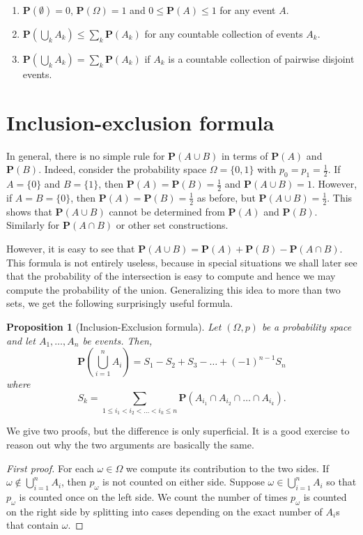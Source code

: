 \documentclass[preprint,  11pt]{amsart}
\newcommand{\para}[1]{\vspace{4mm}\noindent{\bfseries #1:}}
\theoremstyle{plain} %
\newtheorem{proposition}[theorem]{Proposition}
\theoremstyle{definition} %
\begin{document}
{{{{{{{{{{{{\para{The basic rules of probability}
{\begin{enumerate}\setlength\itemsep{6pt}
\item $\mathbf{P}(\emptyset)=0$, $\mathbf{P}(\Omega)=1$ and $0\le \mathbf{P}(A)\le 1$ for any event $A$.
\item $\mathbf{P}\left(\bigcup\limits_{k}A_{k}\right)\le \sum\limits_{k} \mathbf{P}(A_{k})$ for any countable collection of events $A_{k}$.
\item $\mathbf{P}\left(\bigcup\limits_{k}A_{k}\right)=\sum\limits_{k}\mathbf{P}(A_{k})$ if $A_{k}$ is a countable collection of pairwise disjoint events.
\end{enumerate}




\section{Inclusion-exclusion formula}
In general, there is no simple rule for $\mathbf{P}(A\cup B)$ in terms of $\mathbf{P}(A)$ and $\mathbf{P}(B)$. Indeed, consider the probability space $\Omega=\{0,1\}$ with $p_{0}=p_{1}=\frac{1}{2}$. If $A=\{0\}$ and $B=\{1\}$, then $\mathbf{P}(A)=\mathbf{P}(B)=\frac{1}{2}$ and $\mathbf{P}(A\cup B)=1$. However, if $A=B=\{0\}$, then $\mathbf{P}(A)=\mathbf{P}(B)=\frac{1}{2}$ as before, but $\mathbf{P}(A\cup B)=\frac{1}{2}$. This shows that $\mathbf{P}(A\cup B)$ cannot be determined from $\mathbf{P}(A)$ and $\mathbf{P}(B)$. Similarly for $\mathbf{P}(A\cap B)$ or other set constructions.

However, it is easy to see that $\mathbf{P}(A\cup B)=\mathbf{P}(A)+\mathbf{P}(B)-\mathbf{P}(A\cap B)$. This formula is not entirely useless, because in special situations we shall later see that the probability of the intersection is easy to compute and hence we may compute the probability of the union. Generalizing this idea to more than two sets, we get the following surprisingly useful formula.
 \begin{proposition}[Inclusion-Exclusion formula]
Let $(\Omega,p)$ be a probability space and let $A_{1},\ldots ,A_{n}$ be events. Then,
$$
\mathbf{P}\left(\bigcup_{i=1}^{n}A_{i}\right) = S_{1}-S_{2}+S_{3}-\ldots +(-1)^{n-1}S_{n}
$$
where
$$
S_{k}=\sum\limits_{1\le i_{1}<i_{2}<\ldots <i_{k}\le n}\mathbf{P}(A_{i_{1}}\cap A_{i_{2}}\cap \ldots \cap A_{i_{k}}).
$$
\end{proposition}
We give two proofs, but the difference  is only superficial. It is a good exercise to reason out why the two arguments are basically the same.
\begin{proof}[First proof] For each $\omega\in \Omega$ we compute its contribution to the two sides. If $\omega\not\in \bigcup_{i=1}^{n}A_{i}$, then $p_{\omega}$ is not counted on either side.  Suppose $\omega\in \bigcup_{i=1}^{n}A_{i}$ so that $p_{\omega}$ is counted once on the left side. We count the number of times $p_{\omega}$ is counted on the right side by splitting into cases depending on the exact number of $A_{i}$s that contain $\omega$.


\end{proof}}}}}}}}}}}}}}
\end{document}
